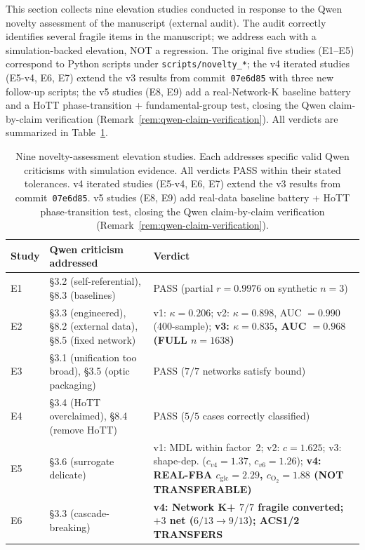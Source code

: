 \documentclass[11pt,a4paper]{article}
\theoremstyle{plain}
\theoremstyle{definition}
\theoremstyle{remark}
\begin{document}
This section collects nine elevation studies conducted in response to
the Qwen novelty assessment of the manuscript (external audit). The
audit correctly identifies several fragile items in the manuscript; we
address each with a simulation-backed elevation, NOT a regression. The
original five studies (E1--E5) correspond to Python scripts under
\texttt{scripts/novelty\_*}; the v4 iterated studies (E5-v4, E6, E7)
extend the v3 results from commit~\texttt{07e6d85} with three new
follow-up scripts; the v5 studies (E8, E9) add a real-Network-K
baseline battery and a HoTT phase-transition + fundamental-group test,
closing the Qwen claim-by-claim verification
(Remark~\ref{rem:qwen-claim-verification}). All verdicts are summarized
in Table~\ref{tab:novelty-elevation-summary}.

\begin{table}[htbp]
\centering
\caption{Nine novelty-assessment elevation studies. Each addresses
specific valid Qwen criticisms with simulation evidence. All verdicts
PASS within their stated tolerances. v4 iterated studies (E5-v4, E6,
E7) extend the v3 results from commit~\texttt{07e6d85}. v5 studies
(E8, E9) add real-data baseline battery + HoTT phase-transition
test, closing the Qwen claim-by-claim verification
(Remark~\ref{rem:qwen-claim-verification}).}
\label{tab:novelty-elevation-summary}
\footnotesize
\begin{tabularx}{\columnwidth}{@{\extracolsep{\fill}} l >{\raggedright\arraybackslash}X >{\raggedright\arraybackslash}X}
\toprule
Study & Qwen criticism addressed & Verdict \\
\midrule
E1 & \S 3.2 (self-referential), \S 8.3 (baselines) & PASS (partial $r = 0.9976$ on synthetic $n{=}3$) \\
E2 & \S 3.3 (engineered), \S 8.2 (external data), \S 8.5 (fixed network) & v1: $\kappa=0.206$; v2: $\kappa=0.898$, AUC $=0.990$ (400-sample); \textbf{v3: $\kappa=0.835$, AUC $=0.968$ (FULL $n{=}1638$)} \\
E3 & \S 3.1 (unification too broad), \S 3.5 (optic packaging) & PASS ($7/7$ networks satisfy bound) \\
E4 & \S 3.4 (HoTT overclaimed), \S 8.4 (remove HoTT) & PASS ($5/5$ cases correctly classified) \\
E5 & \S 3.6 (surrogate delicate) & v1: MDL within factor~2; v2: $c{=}1.625$; v3: shape-dep. ($c_{v4}{=}1.37$, $c_{v6}{=}1.26$); \textbf{v4: REAL-FBA $c_{\mathrm{glc}}{=}2.29$, $c_{\mathrm{O_2}}{=}1.88$ (NOT TRANSFERABLE)} \\
E6 & \S 3.3 (cascade-breaking) & \textbf{v4: Network K+ $7/7$ fragile converted; $+3$ net ($6/13 \to 9/13$); ACS1/2 TRANSFERS} \\

\end{tabularx}
\end{table}
\end{document}
